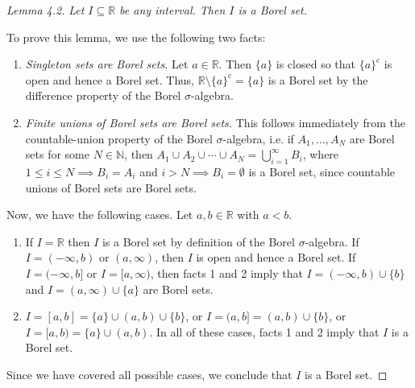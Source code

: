 \begin{proof}[Lemma 4.2]
\emph{Let \( I \subseteq \mathbb{R} \) be any interval. Then \( I \) is a Borel set.}

To prove this lemma, we use the following two facts:
\begin{enumerate}
	\item \emph{Singleton sets are Borel sets.} Let \( a \in \mathbb{R} \). Then \( \{ a \}  \) is closed so that \( \{ a \} ^{c}  \) is open and hence a Borel set. Thus, \( \mathbb{R} \setminus \{ a \} ^{c} = \{ a \}  \) is a Borel set by the difference property of the Borel \(\sigma\)-algebra.
	\item \emph{Finite unions of Borel sets are Borel sets.} This follows immediately from the countable-union property of the Borel \(\sigma\)-algebra, i.e. if \( A_1, \hdots , A_N \) are Borel sets for some \( N \in \mathbb{N}  \), then \(A_1\cup A_2 \cup \cdots \cup A_N =  \bigcup_{i=1}^{\infty} B_i\), where \( 1 \leq i \leq N \implies B_i = A_i \) and \( i > N \implies B_i = \emptyset  \) is a Borel set, since countable unions of Borel sets are Borel sets.
\end{enumerate}
Now, we have the following cases. Let \( a , b \in \mathbb{R} \) with \( a < b \).
\begin{enumerate}
	\item If \( I = \mathbb{R} \) then \( I \) is a Borel set by definition of the Borel \(\sigma\)-algebra. If \( I = (-\infty, b) \) or \( (a, \infty) \), then \( I \) is open and hence a Borel set. If \( I = (-\infty, b] \) or \( I = [a, \infty) \), then facts 1 and 2 imply that \( I = (-\infty, b) \cup \{ b \}  \) and \( I = (a, \infty) \cup \{ a \}  \) are Borel sets.
	\item \( I = [a,b] = \{ a \} \cup (a,b) \cup \{ b \} \), or \(I =  (a,b] = (a,b) \cup \{ b \} \), or \( I = [a,b) = \{ a \} \cup (a,b) \). In all of these cases, facts 1 and 2 imply that \( I \) is a Borel set.
\end{enumerate}
Since we have covered all possible cases, we conclude that \( I \) is a Borel set.
\end{proof}
